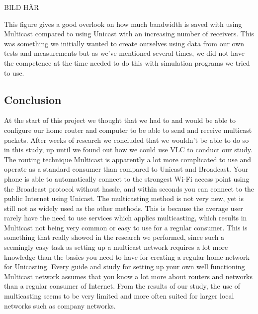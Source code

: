\documentclass[9pt,a4paper]{acmproc}
\begin{document}
BILD HÄR

This figure gives a good overlook on how much bandwidth is saved with using Multicast compared to using Unicast with an increasing number of receivers. This was something we initially wanted to create ourselves using data from our own tests and measurements but as we’ve mentioned several times, we did not have the competence at the time needed to do this with simulation programs we tried to use.


\subsection{Conclusion}

At the start of this project we thought that we had to and would be able to configure our home router and computer to be able to send and receive multicast packets. After weeks of research we concluded that we wouldn’t be able to do so in this study, up until we found out how we could use VLC to conduct our study. The routing technique Multicast is apparently a lot more complicated to use and operate as a standard consumer than compared to Unicast and Broadcast. Your phone is able to automatically connect to the strongest Wi-Fi access point using the Broadcast protocol without hassle, and within seconds you can connect to the public Internet using Unicast. The multicasting method is not very new, yet is still not as widely used as the other methods. This is because the average user rarely have the need to use services which applies multicasting, which results in Multicast not being very common or easy to use for a regular consumer. This is something that really showed in the research we performed, since such a seemingly easy task as setting up a multicast network requires a lot more knowledge than the basics you need to have for creating a regular home network for Unicasting. Every guide and study for setting up your own well functioning Multicast network assumes that you know a lot more about routers and networks than a regular consumer of Internet. From the results of our study, the use of multicasting seems to be very limited and more often suited for larger local networks such as company networks.

\clearpage
\end{document}
